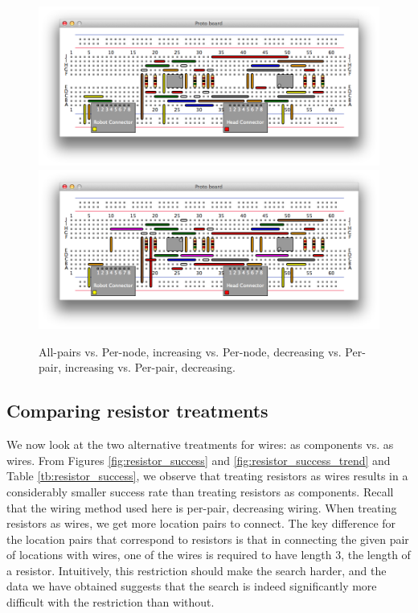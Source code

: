 \begin{figure}
\begin{center}
\includegraphics[width=\textwidth]{Images/exemplar_per_pair_increasing.png}
\includegraphics[width=\textwidth]{Images/exemplar_per_pair_decreasing.png}
\caption{All-pairs vs. Per-node, increasing vs. Per-node, decreasing vs.
Per-pair, increasing vs. Per-pair, decreasing.}
\end{center}
\end{figure}

\subsection{Comparing resistor treatments}

We now look at the two alternative treatments for wires: as components vs. as
wires. From Figures \ref{fig:resistor_success} and \ref{fig:resistor_success_trend}
and Table \ref{tb:resistor_success}, we observe that treating resistors as wires
results in a considerably smaller success rate than treating resistors as
components. Recall that the wiring method used here is per-pair, decreasing wiring.
When treating resistors as wires, we get more location pairs to connect.
The key difference for
the location pairs that correspond to resistors is that in connecting the given
pair of locations with wires, one of the wires is required to have length $3$,
the length of a resistor. Intuitively, this restriction should make the search
harder, and the data we have obtained suggests that the search is indeed
significantly more difficult with the restriction than without.

